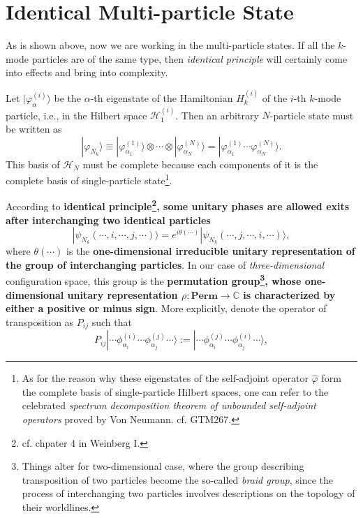 \documentclass[b5paper,10pt,UTF8]{book}
\numberwithin{equation}{section}
\begin{document}
	\section{Identical Multi-particle State}
		As is shown above, now we are working in the multi-particle states. If all the $k$-mode particles are of the same type, then \emph{identical principle} will certainly come into effects and bring into complexity.\par
		Let $|\varphi_\alpha^{(i)}\rangle$ be the $\alpha$-th eigenstate of the Hamiltonian $H_k^{(i)}$ of the $i$-th $k$-mode particle, i.e., in the Hilbert space $\mathcal{H}^{(i)}_1$. Then an arbitrary $N$-particle state must be written as
		\begin{equation}\label{1.4.0}
			|\varphi_{N_k}\rangle\equiv|\varphi_{\alpha_1}^{(1)}\rangle\otimes\cdots\otimes|\varphi_{\alpha_N}^{(N)}\rangle=|\varphi_{\alpha_1}^{(1)}\cdots\varphi_{\alpha_N}^{(N)}\rangle.
		\end{equation}
		This basis of $\mathcal{H}_{N}$ must be complete because each components of it is the complete basis of single-particle state\footnote{As for the reason why these eigenstates of the self-adjoint operator $\hat{\varphi}$ form the complete basis of single-particle Hilbert spaces, one can refer to the celebrated \emph{spectrum decomposition theorem of unbounded self-adjoint operators} proved by Von Neumann. cf. GTM267.}.\par
		According to \textbf{identical principle\footnote{cf. chpater 4 in Weinberg I.}, some unitary phases are allowed exits after interchanging two identical particles}
		$$|\psi_{N_k}(\cdots,i,\cdots,j,\cdots)\rangle=e^{i\theta(\cdots)}|\psi_{N_k}(\cdots,j,\cdots,i,\cdots)\rangle,$$
		where $\theta(\cdots)$ is the \textbf{one-dimensional irreducible unitary representation of the group of interchanging particles}. In our case of \emph{three-dimensional} configuration space, this group is the \textbf{permutation group\footnote{Things alter for two-dimensional case, where the group describing transposition of two particles become the so-called \emph{braid group}, since the process of interchanging two particles involves descriptions on the topology of their worldlines.}, whose one-dimensional unitary representation $\rho:\mathbf{Perm}\rightarrow\mathbb{C}$ is characterized by either a positive or minus sign}. %
		More explicitly, denote the operator of transposition as $P_{ij}$ such that
		$$P_{ij}|\cdots\phi_{\alpha_i}^{(i)}\cdots\phi_{\alpha_j}^{(j)}\cdots\rangle:=|\cdots\phi_{\alpha_i}^{(j)}\cdots\phi_{\alpha_j}^{(i)}\cdots\rangle,$$
\end{document}
